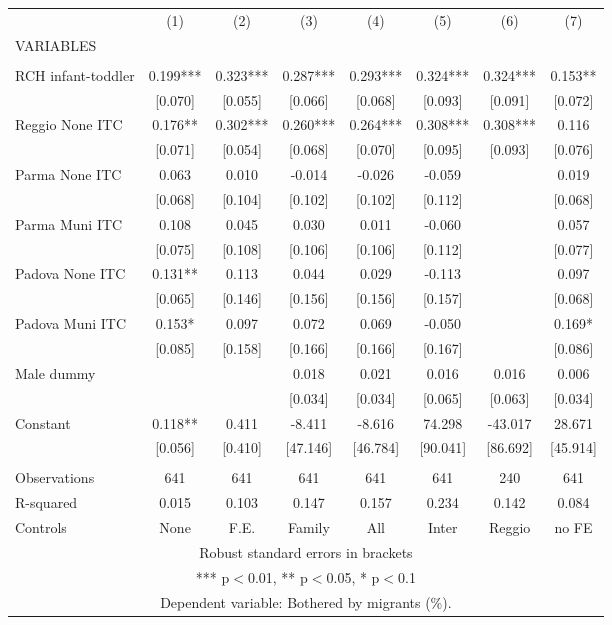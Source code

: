 \begin{tabular}{lccccccc} \hline
 & (1) & (2) & (3) & (4) & (5) & (6) & (7) \\
VARIABLES &  &  &  &  &  &  &  \\ \hline
 &  &  &  &  &  &  &  \\
RCH infant-toddler & 0.199*** & 0.323*** & 0.287*** & 0.293*** & 0.324*** & 0.324*** & 0.153** \\
 & [0.070] & [0.055] & [0.066] & [0.068] & [0.093] & [0.091] & [0.072] \\
Reggio None ITC & 0.176** & 0.302*** & 0.260*** & 0.264*** & 0.308*** & 0.308*** & 0.116 \\
 & [0.071] & [0.054] & [0.068] & [0.070] & [0.095] & [0.093] & [0.076] \\
Parma None ITC & 0.063 & 0.010 & -0.014 & -0.026 & -0.059 &  & 0.019 \\
 & [0.068] & [0.104] & [0.102] & [0.102] & [0.112] &  & [0.068] \\
Parma Muni ITC & 0.108 & 0.045 & 0.030 & 0.011 & -0.060 &  & 0.057 \\
 & [0.075] & [0.108] & [0.106] & [0.106] & [0.112] &  & [0.077] \\
Padova None ITC & 0.131** & 0.113 & 0.044 & 0.029 & -0.113 &  & 0.097 \\
 & [0.065] & [0.146] & [0.156] & [0.156] & [0.157] &  & [0.068] \\
Padova Muni ITC & 0.153* & 0.097 & 0.072 & 0.069 & -0.050 &  & 0.169* \\
 & [0.085] & [0.158] & [0.166] & [0.166] & [0.167] &  & [0.086] \\
Male dummy &  &  & 0.018 & 0.021 & 0.016 & 0.016 & 0.006 \\
 &  &  & [0.034] & [0.034] & [0.065] & [0.063] & [0.034] \\
Constant & 0.118** & 0.411 & -8.411 & -8.616 & 74.298 & -43.017 & 28.671 \\
 & [0.056] & [0.410] & [47.146] & [46.784] & [90.041] & [86.692] & [45.914] \\
 &  &  &  &  &  &  &  \\
Observations & 641 & 641 & 641 & 641 & 641 & 240 & 641 \\
R-squared & 0.015 & 0.103 & 0.147 & 0.157 & 0.234 & 0.142 & 0.084 \\
 Controls & None & F.E. & Family & All & Inter & Reggio & no FE \\ \hline
\multicolumn{8}{c}{ Robust standard errors in brackets} \\
\multicolumn{8}{c}{ *** p$<$0.01, ** p$<$0.05, * p$<$0.1} \\
\multicolumn{8}{c}{ Dependent variable: Bothered by migrants (\%).} \\
\end{tabular}
